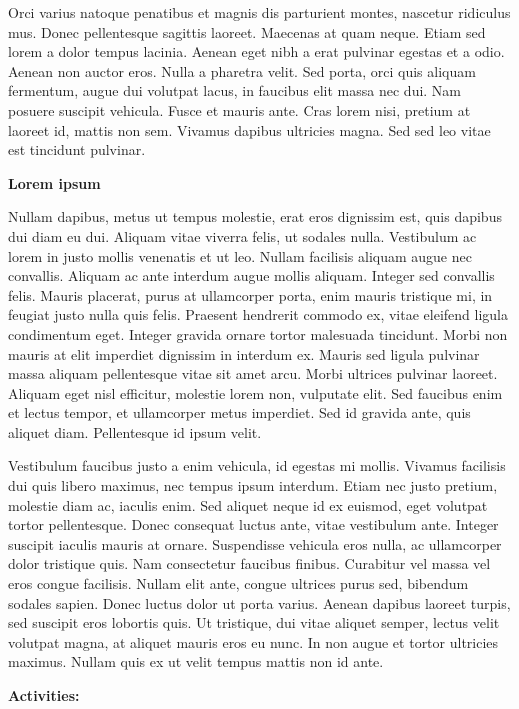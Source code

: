 \documentclass[
]{book}
\begin{document}
Orci varius natoque penatibus et magnis dis parturient montes, nascetur ridiculus mus. Donec pellentesque sagittis laoreet. Maecenas at quam neque. Etiam sed lorem a dolor tempus lacinia. Aenean eget nibh a erat pulvinar egestas et a odio. Aenean non auctor eros. Nulla a pharetra velit. Sed porta, orci quis aliquam fermentum, augue dui volutpat lacus, in faucibus elit massa nec dui. Nam posuere suscipit vehicula. Fusce et mauris ante. Cras lorem nisi, pretium at laoreet id, mattis non sem. Vivamus dapibus ultricies magna. Sed sed leo vitae est tincidunt pulvinar.

\textbf{Lorem ipsum}

Nullam dapibus, metus ut tempus molestie, erat eros dignissim est, quis dapibus dui diam eu dui. Aliquam vitae viverra felis, ut sodales nulla. Vestibulum ac lorem in justo mollis venenatis et ut leo. Nullam facilisis aliquam augue nec convallis. Aliquam ac ante interdum augue mollis aliquam. Integer sed convallis felis. Mauris placerat, purus at ullamcorper porta, enim mauris tristique mi, in feugiat justo nulla quis felis. Praesent hendrerit commodo ex, vitae eleifend ligula condimentum eget. Integer gravida ornare tortor malesuada tincidunt. Morbi non mauris at elit imperdiet dignissim in interdum ex. Mauris sed ligula pulvinar massa aliquam pellentesque vitae sit amet arcu. Morbi ultrices pulvinar laoreet. Aliquam eget nisl efficitur, molestie lorem non, vulputate elit. Sed faucibus enim et lectus tempor, et ullamcorper metus imperdiet. Sed id gravida ante, quis aliquet diam. Pellentesque id ipsum velit.

Vestibulum faucibus justo a enim vehicula, id egestas mi mollis. Vivamus facilisis dui quis libero maximus, nec tempus ipsum interdum. Etiam nec justo pretium, molestie diam ac, iaculis enim. Sed aliquet neque id ex euismod, eget volutpat tortor pellentesque. Donec consequat luctus ante, vitae vestibulum ante. Integer suscipit iaculis mauris at ornare. Suspendisse vehicula eros nulla, ac ullamcorper dolor tristique quis. Nam consectetur faucibus finibus. Curabitur vel massa vel eros congue facilisis. Nullam elit ante, congue ultrices purus sed, bibendum sodales sapien. Donec luctus dolor ut porta varius. Aenean dapibus laoreet turpis, sed suscipit eros lobortis quis. Ut tristique, dui vitae aliquet semper, lectus velit volutpat magna, at aliquet mauris eros eu nunc. In non augue et tortor ultricies maximus. Nullam quis ex ut velit tempus mattis non id ante.

\textbf{Activities:}
\end{document}
